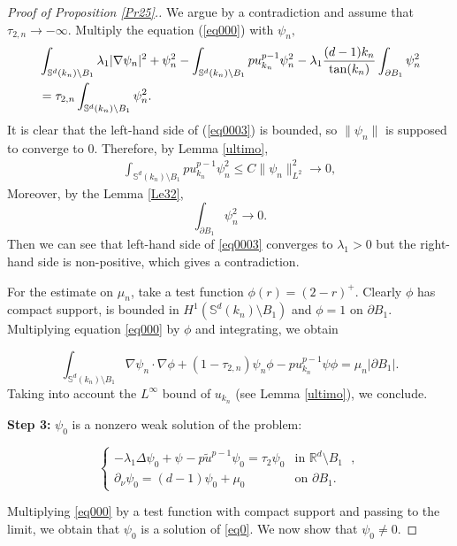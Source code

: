 \documentclass[reqno]{amsart}
\numberwithin{equation}{section}
\newenvironment{key words}{\textbf{Keywords}\mbox{  }}{ }
\begin{document}
\begin{proof}[Proof of Proposition \ref{Pr25}.]
We argue by a contradiction and assume that $\tau_{2,n}\rightarrow -\infty.$
Multiply the equation (\ref{eq000}) with $\psi_{n},$
\begin{align}\label{eq0003}
 &\int_{\mathbb{S}^{d}(k_{n})\setminus B_{1}} \lambda_{1} |\nabla \psi_{n}|^{2}+ \psi_{n}^{2}-\int_{\mathbb{S}^{d}(k_{n})\setminus B_{1}} pu_{k_{n}}^{p-1}\psi_{n}^{2}-\lambda_{1}\frac{(d-1)k_n}{\tan(k_n)}  \int_{\partial B_{1}}\psi_{n}^2\notag\\
 &=\tau_{2,n}\int_{\mathbb{S}^{d}(k_{n})\setminus B_{1}}\psi_{n}^{2}.
\end{align}
It is clear that the left-hand side of (\ref{eq0003}) is bounded, so $\|\psi_{n}\|$ is supposed to converge to $0$. Therefore, by Lemma \ref{ultimo},
\begin{align*}
\int_{\mathbb{S}^{d}(k_{n})\setminus B_{1}} pu_{k_{n}}^{p-1}\psi_{n}^{2}
\leq C \|\psi_{n}\|_{L^{2}}^{2}
\rightarrow 0,
\end{align*}
Moreover, by the Lemma \ref{Le32},
 \[ \int_{\partial B_{1}}\psi_{n}^2\rightarrow0.\]
Then we can see that left-hand side of \eqref{eq0003} converges to $\lambda_{1}>0$ but the right-hand side is non-positive, which gives a contradiction.

For the estimate on $\mu_n$, take a test function $\phi(r)= (2-r)^+$. Clearly $\phi$ has compact support, is bounded in $H^1(\mathbb{S}^d (k_{n})\setminus B_1)$ and $\phi=1$ on $\partial B_1$. Multiplying equation \eqref{eq000} by $\phi$ and integrating, we obtain

$$\int_{\mathbb{S}^d(k_{n})\setminus B_1} \nabla \psi_n \cdot \nabla \phi + (1-\tau_{2,n}) \psi_n \phi - p u_{k_n}^{p-1} \psi \phi = \mu_n |\partial B_1|.$$
Taking into account the $L^{\infty}$ bound of $u_{k_n}$ (see Lemma \ref{ultimo}), we conclude.

\medskip

\textbf{Step 3:}  $\psi_0$ is a nonzero weak solution of the problem:

\begin{equation}\label{eq0}
	\begin{cases}
		-\lambda_{1}\Delta\psi_{0}+\psi_{}-p\tilde{u} ^{p-1}\psi_{0}= \tau_{2}\psi_{0}&\mbox{in $\mathbb{R}^{d}\setminus B_{1}$ },\\
		\partial_{\nu}\psi_{0}=(d-1) \psi_{0} +\mu_0 &\mbox{on $\partial B_1$}.
	\end{cases}
\end{equation}

Multiplying \eqref{eq000} by a test function with compact support and passing to the limit, we obtain that $\psi_0$ is a solution of \eqref{eq0}. We now show that $\psi_0 \neq 0$.


\end{proof}
\end{document}
